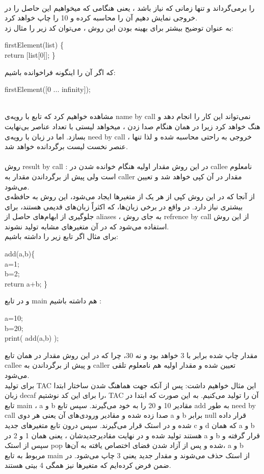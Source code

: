 \\
را برمی‌گرداند
و تنها زمانی که نیاز باشد ،
یعنی هنگامی که میخواهیم این حاصل را در خروجی نمایش دهیم 
آن را محاسبه کرده و 10 را چاپ خواهد کرد.
\\
به عنوان توضیح بیشتر برای بهینه بودن این روش ،
می‌توان کد زیر را مثال زد:
\begin{latin}
firstElement(list)
\small\{
\\
return [list[0]];
\small\}
\\
\end{latin}
که اگر آن را اینگونه فراخوانده باشیم:
\\
\begin{latin}
firstElement([0 ... infinity]);
\end{latin}
\\
مشاهده خواهیم کرد که تابع با رویه‌ی
name by call
نمی‌تواند این کار را انجام دهد و هنگ خواهد کرد زیرا در همان هنگام صدا زدن ،
میخواهد لیستی با تعداد عناصر بی‌نهایت بسازد.
اما در زبان با رویه‌ی
need by call
،
خروجی به راحتی محاسبه شده و لذا تنها عنصر نخست لیست برگردانده خواهد شد.
\\
\\
روش 
result by call
:
در این روش
مقدار اولیه
هنگام خوانده شدن در 
callee
نامعلوم است ولی پیش از برگرداندن مقدار به
caller
مقدار در آن کپی خواهد شد و تعیین می‌شود.
\\
از آنجا که در این روش کپی از هر یک از متغیرها ایجاد می‌شود،
این روش به حافظه‌ی بیشتری نیاز دارد.
در واقع در برخی زبان‌ها، که اکثراً زبان‌های قدیمی هستند،
برای جلوگیری از ابهام‌های حاصل از
aliases
،
به جای روش
refrence by call
از این روش استفاده می‌شود که در آن متغیرهای
مشابه تولید نشوند.
\\
برای مثال اگر تابع  زیر را داشته باشیم:
\begin{latin}
add(a,b)\small\{
\\
a=1;
\\
b=2;
\\
return a+b;
\small\}
\\
\end{latin}
و در تابع main
هم داشته باشیم
:
\begin{latin}
a=10;
\\
b=20;
\\
print( add(a,b) );
\end{latin}
مقدار چاپ شده برابر با 3 خواهد بود و نه 30،
چرا که در این روش مقدار در همان تابع callee
و پیش از برگرداندن به 
caller
تعیین شده و مقدار اولیه هم 
نامعلوم تلقی می‌شود.
\\
برای تولید
TAC
این مثال خواهیم داشت:
پس از آنکه جهت هماهنگ شدن ساختار ابتدا زبان decaf
را برای این کد نوشتیم،
TAC
آن را تولید می‌کنیم.
به این صورت که ابتدا در تابع 
main
،
a
و
b
مقادیر 10 و 20 را به
خود می‌گیرند.
سپس تابع
add
به طور
need by call
صدا زده شده و مقادیر ورودی‌های
آن یعنی هر دوی 
a
و
b
برابر
null
قرار داده شده و در استک قرار می‌گیرند.
سپس درون تابع متغیرهای جدید 
c
و
d
که همان
a
و
b
هستند تولید شده و در نهایت مقادیرجدیدشان 
،
یعنی همان 1 و 2
در
a
و
b
قرار گرفته و سپس از استک
pop 
شده و پس از آزاد شدن فضای اختصاص یافته به آن‌ها،
a
و
b
مربوط به تابع
main
از استک حذف می‌شوند و مقدار جدید یعنی 3
چاپ می‌شود.
در ضمن فرض کرده‌ایم که متغیرها نیز همگی 4 بیتی هستند.

